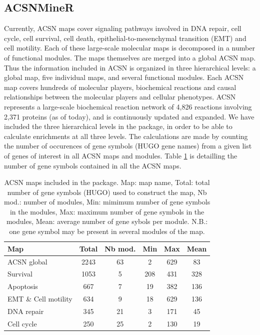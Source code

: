 \subsection{ACSNMineR}
Currently, ACSN maps cover signaling pathways involved in DNA repair, cell
cycle, cell survival, cell death, epithelial-to-mesenchymal transition (EMT) and
cell motility. Each of these large-scale molecular maps is decomposed in a number
of functional modules. The maps themselves are merged into a global ACSN map.
Thus the information included in ACSN is organized in three hierarchical levels:
a global map, five individual maps, and several functional modules. Each
ACSN map covers hundreds of molecular players, biochemical reactions and causal
relationships between the molecular players and cellular phenotypes.  ACSN
represents a large-scale biochemical reaction network of 4,826 reactions
involving 2,371 proteins (as of today), and is continuously updated and expanded.  We have
included the three hierarchical levels in the  package, in order
to be able to calculate enrichments at all three levels. The calculations are
made by counting the number of occurences of gene symbols (HUGO gene names) from
a given list of genes of interest in all ACSN maps and modules. Table
\ref{tab:table1} is detailling the number of gene symbols contained in all the ACSN
maps.


\begin{table}[h!]
 \centering
  \caption{ACSN maps included in the  package. Map: map name,
  Total: total number of gene symbols (HUGO) used to construct the map, Nb
  mod.: number of modules, Min: mimimum number of gene symbols in the modules,
  Max: maximum number of gene symbols in the modules, Mean: average number of
  gene sybols per module. N.B.: one gene symbol may be present in several
  modules of the map.} \label{tab:table1}
  \begin{tabular}{l c c c c c}
    \toprule
    Map & Total & Nb mod. & Min & Max & Mean\\
    \midrule
  ACSN global & 2243 & 63 & 2 &629& 83\\
  Survival  &1053&5  &208 &431 &328\\
  Apoptosis & 667&7 & 19& 382& 136\\
  EMT \& Cell motility &634 &9  &18 &629 &136\\
  DNA repair &345&21  &3 &171  &45\\
  Cell cycle &250&25  &2 &130  &19\\
  \bottomrule

  \end{tabular}

\end{table}


